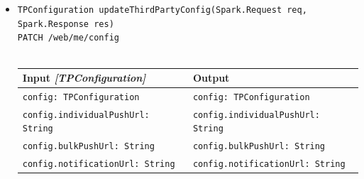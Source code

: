 \documentclass[a4paper, hidelinks, 12pt]{report}
\begin{document}
\begin{itemize}
\begin{itemize}
\begin{itemize}
\begin{tabular}{l | l}
				\end{tabular}\\
				
		\item{\verb|TPConfiguration updateThirdPartyConfig(Spark.Request req,|\\ \verb|Spark.Response res)|\\ \verb|PATCH /web/me/config|}\\\\
			\begin{tabular}{l | l}
			\textbf{Input} \textit{[TPConfiguration]} & \textbf{Output} \\
			\hline
				\verb|config: TPConfiguration| & \verb|config: TPConfiguration| \\
				\verb|config.individualPushUrl: String|& \verb|config.individualPushUrl: String| \\
				\verb|config.bulkPushUrl: String|& \verb|config.bulkPushUrl: String| \\
				\verb|config.notificationUrl: String|& \verb|config.notificationUrl: String| \\
			\end{tabular}\\      			
		\end{itemize}
	\end{itemize}
\end{itemize}
\end{document}
